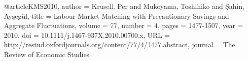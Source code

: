 @article{KMS2010,
author = {Krusell, Per and Mukoyama, Toshihiko and Şahin, Ayşegül}, 
title = {Labour-Market Matching with Precautionary Savings and Aggregate Fluctuations},
volume = {77}, 
number = {4}, 
pages = {1477-1507}, 
year = {2010}, 
doi = {10.1111/j.1467-937X.2010.00700.x},  
URL = {http://restud.oxfordjournals.org/content/77/4/1477.abstract}, 
journal = {The Review of Economic Studies} 
}